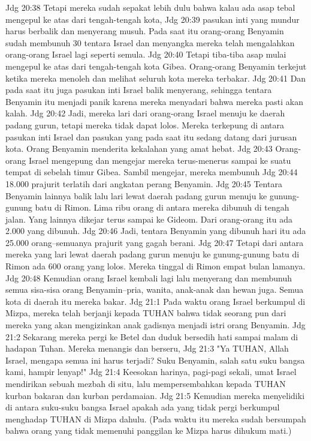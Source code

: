 Jdg 20:38  Tetapi mereka sudah sepakat lebih dulu bahwa kalau ada asap tebal mengepul ke atas dari tengah-tengah kota,
Jdg 20:39  pasukan inti yang mundur harus berbalik dan menyerang musuh. Pada saat itu orang-orang Benyamin sudah membunuh 30 tentara Israel dan menyangka mereka telah mengalahkan orang-orang Israel lagi seperti semula.
Jdg 20:40  Tetapi tiba-tiba asap mulai mengepul ke atas dari tengah-tengah kota Gibea. Orang-orang Benyamin terkejut ketika mereka menoleh dan melihat seluruh kota mereka terbakar.
Jdg 20:41  Dan pada saat itu juga pasukan inti Israel balik menyerang, sehingga tentara Benyamin itu menjadi panik karena mereka menyadari bahwa mereka pasti akan kalah.
Jdg 20:42  Jadi, mereka lari dari orang-orang Israel menuju ke daerah padang gurun, tetapi mereka tidak dapat lolos. Mereka terkepung di antara pasukan inti Israel dan pasukan yang pada saat itu sedang datang dari jurusan kota. Orang Benyamin menderita kekalahan yang amat hebat.
Jdg 20:43  Orang-orang Israel mengepung dan mengejar mereka terus-menerus sampai ke suatu tempat di sebelah timur Gibea. Sambil mengejar, mereka membunuh
Jdg 20:44  18.000 prajurit terlatih dari angkatan perang Benyamin.
Jdg 20:45  Tentara Benyamin lainnya balik lalu lari lewat daerah padang gurun menuju ke gunung-gunung batu di Rimon. Lima ribu orang di antara mereka dibunuh di tengah jalan. Yang lainnya dikejar terus sampai ke Gideom. Dari orang-orang itu ada 2.000 yang dibunuh.
Jdg 20:46  Jadi, tentara Benyamin yang dibunuh hari itu ada 25.000 orang--semuanya prajurit yang gagah berani.
Jdg 20:47  Tetapi dari antara mereka yang lari lewat daerah padang gurun menuju ke gunung-gunung batu di Rimon ada 600 orang yang lolos. Mereka tinggal di Rimon empat bulan lamanya.
Jdg 20:48  Kemudian orang Israel kembali lagi lalu menyerang dan membunuh semua sisa-sisa orang Benyamin--pria, wanita, anak-anak dan hewan juga. Semua kota di daerah itu mereka bakar.
Jdg 21:1  Pada waktu orang Israel berkumpul di Mizpa, mereka telah berjanji kepada TUHAN bahwa tidak seorang pun dari mereka yang akan mengizinkan anak gadisnya menjadi istri orang Benyamin.
Jdg 21:2  Sekarang mereka pergi ke Betel dan duduk bersedih hati sampai malam di hadapan Tuhan. Mereka menangis dan berseru,
Jdg 21:3  "Ya TUHAN, Allah Israel, mengapa semua ini harus terjadi? Suku Benyamin, salah satu suku bangsa kami, hampir lenyap!"
Jdg 21:4  Keesokan harinya, pagi-pagi sekali, umat Israel mendirikan sebuah mezbah di situ, lalu mempersembahkan kepada TUHAN kurban bakaran dan kurban perdamaian.
Jdg 21:5  Kemudian mereka menyelidiki di antara suku-suku bangsa Israel apakah ada yang tidak pergi berkumpul menghadap TUHAN di Mizpa dahulu. (Pada waktu itu mereka sudah bersumpah bahwa orang yang tidak memenuhi panggilan ke Mizpa harus dihukum mati.)
